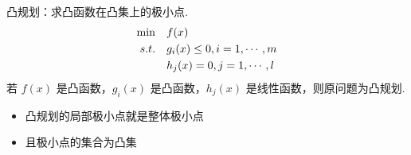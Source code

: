\begin{definition}
    凸规划：求凸函数在凸集上的极小点.
    \begin{align*}
        \min \quad &f(x)\\ 
        s.t. \quad &g_{i}(x) \le 0, i=1, \cdots, m \\  
        &h_{j}(x)=0, j=1, \cdots, l 
    \end{align*}
    若 $f(x)$ 是凸函数，$g_i(x)$ 是凸函数，$h_j(x)$ 是线性函数，则原问题为凸规划.
    \begin{itemize} 
        \item 凸规划的局部极小点就是整体极小点
        \item 且极小点的集合为凸集
    \end{itemize}
\end{definition}

